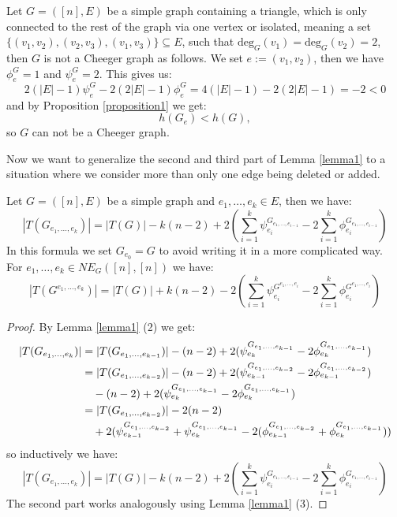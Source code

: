 \begin{expl}
Let \(G=([n],E)\) be a simple graph containing a triangle, which is only connected to the rest of the graph via one vertex or isolated, meaning a set \(\{(v_1,v_2),(v_2,v_3),(v_1,v_3)\}\subseteq E\), such that \(\text{deg}_G(v_1)=\text{deg}_G(v_2)=2\), then \(G\) is not a Cheeger graph as follows. We set \(e:=(v_1,v_2)\), then we have \(\phi_e^G=1\) and \(\psi_e^G=2\). This gives us:
\[
2(|E|-1)\psi_e^G-2(2|E|-1)\phi_e^G=4(|E|-1)-2(2|E|-1)=-2<0
\]
and by Proposition \ref{proposition1} we get:
\[
h(G_e)<h(G),
\]
so \(G\) can not be a Cheeger graph.
\end{expl}
Now we want to generalize the second and third part of Lemma \ref{lemma1} to a situation where we consider more than only one edge being deleted or added.
\begin{lem}\label{lemma3}
Let \(G=([n],E)\) be a simple graph and \(e_1,\ldots,e_k\in E\), then we have:
\[
|T(G_{e_1,\ldots,e_k})|=|T(G)|-k(n-2)+2(\sum\limits_{i=1}^k\psi_{e_i}^{G_{e_1,\ldots,e_{i-1}}}-2\sum\limits_{i=1}^k\phi_{e_i}^{G_{e_1,\ldots,e_{i-1}}})
\]
In this formula we set \(G_{e_0}=G\) to avoid writing it in a more complicated way.\\
For \(e_1,\ldots,e_k\in NE_G([n],[n])\) we have:
\[
|T(G^{e_1,\ldots,e_k})|=|T(G)|+k(n-2)-2(\sum\limits_{i=1}^k\psi_{e_i}^{G^{e_1,\ldots,e_i}}-2\sum\limits_{i=1}^k\phi_{e_i}^{G^{e_1,\ldots,e_i}})
\]
\begin{proof}
By Lemma \ref{lemma1} (2) we get:
\begin{align}
|T(G_{e_1,\ldots,e_k})|&=|T(G_{e_1,\ldots,e_{k-1}})|-(n-2)+2(\psi_{e_k}^{G_{e_1,\ldots,e_{k-1}}}-2\phi_{e_k}^{G_{e_1,\ldots,e_{k-1}}})\notag\\
&=|T(G_{e_1,\ldots,e_{k-2}})|-(n-2)+2(\psi_{e_{k-1}}^{G_{e_1,\ldots,e_{k-2}}}-2\phi_{e_{k-1}}^{G_{e_1,\ldots,e_{k-2}}})\notag\\
&\quad-(n-2)+2(\psi_{e_k}^{G_{e_1,\ldots,e_{k-1}}}-2\phi_{e_k}^{G_{e_1,\ldots,e_{k-1}}})\notag\\
&=|T(G_{e_1,\ldots,e_{k-2}})|-2(n-2)\notag\\
&\quad+2(\psi_{e_{k-1}}^{G_{e_1,\ldots,e_{k-2}}}+\psi_{e_k}^{G_{e_1,\ldots,e_{k-1}}}-2(\phi_{e_{k-1}}^{G_{e_1,\ldots,e_{k-2}}}+\phi_{e_k}^{G_{e_1,\ldots,e_{k-1}}}))\notag
\end{align}
so inductively we have:
\[
|T(G_{e_1,\ldots,e_k})|=|T(G)|-k(n-2)+2(\sum\limits_{i=1}^k\psi_{e_i}^{G_{e_1,\ldots,e_{i-1}}}-2\sum\limits_{i=1}^k\phi_{e_i}^{G_{e_1,\ldots,e_{i-1}}})
\]
The second part works analogously using Lemma \ref{lemma1} (3). 
\end{proof}
\end{lem}
